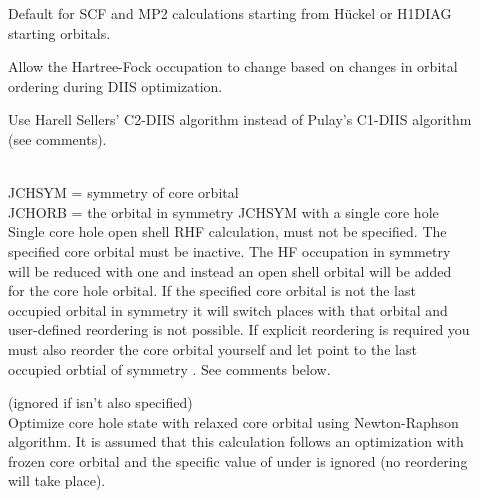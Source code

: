 \begin{description}
\item[]
  Default for SCF and MP2 calculations starting from H\"{u}ckel or H1DIAG
  starting orbitals. 

  Allow the Hartree-Fock occupation to  
  change based on changes in 
  orbital ordering during DIIS optimization.

\item[]
  Use Harell Sellers' C2-DIIS algorithm instead of Pulay's C1-DIIS algorithm
  (see comments).

\item[]
   \\
  JCHSYM = symmetry of core orbital\\
  JCHORB = the orbital in symmetry JCHSYM with a single core hole\\
  Single core hole open shell RHF calculation,  must not 
  be specified.  The specified core orbital must be
  inactive.
  The HF occupation in symmetry  will be reduced with one
  and instead an 
  open shell orbital will be added for the core hole orbital.
  If the specified core orbital is not the last occupied orbital in symmetry
   it will switch places with that orbital and user-defined reordering
  is not possible.
  If explicit reordering is required you must also reorder
  the core orbital yourself and let  point to the last occupied orbtial
  of symmetry .  See comments below.
 
\item[]
  (ignored if  isn't also specified)\\
  Optimize core hole state with relaxed
  core orbital using Newton-Raphson algorithm.
  It is assumed that this calculation follows an optimization
  with frozen core orbital and the specific value of
   under  is ignored (no
  reordering will take place). 
 


\end{description}
